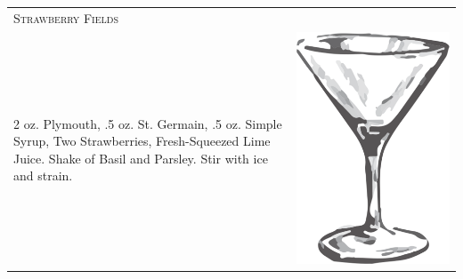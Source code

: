 \documentclass{article}
\begin{document}
\begin{tabular}{p{2in} p{0.5in}}
  \multicolumn{2}{p{3in}}{\centering\Huge\textsc{Strawberry Fields}} \\ 
   \vspace{-0.1in}2 oz. Plymouth, .5 oz. St. Germain, .5 oz. Simple Syrup, Two Strawberries, Fresh-Squeezed Lime Juice. Shake of Basil and Parsley. Stir with ice and strain. &
   \vspace{-0.1in} \includegraphics{goblet.png}
\end{tabular}
\end{document}
